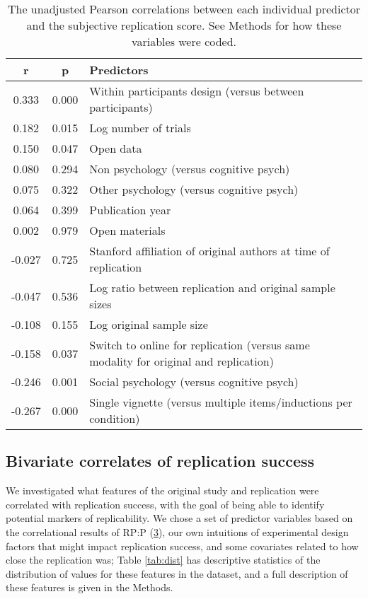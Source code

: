 \documentclass[
  english,
  a4paper,
]{article}
\begin{document}
\begin{table}[!h]

\caption{\label{tab:cor}The unadjusted Pearson correlations between each individual predictor and the subjective replication score. See Methods for how these variables were coded.}
\centering
\fontsize{10}{12}\selectfont
\begin{tabular}[t]{ccl}
\toprule
r & p & Predictors\\
\midrule
0.333 & 0.000 & Within participants design (versus between participants)\\
0.182 & 0.015 & Log number of  trials\\
0.150 & 0.047 & Open data\\
0.080 & 0.294 & Non psychology (versus cognitive psych)\\
0.075 & 0.322 & Other psychology (versus cognitive psych)\\
0.064 & 0.399 & Publication year\\
0.002 & 0.979 & Open materials\\
-0.027 & 0.725 & Stanford affiliation of original authors at time of replication\\
-0.047 & 0.536 & Log ratio between replication and original sample sizes\\
-0.108 & 0.155 & Log original sample size\\
-0.158 & 0.037 & Switch to online for replication (versus same modality for original and replication)\\
-0.246 & 0.001 & Social psychology (versus cognitive psych)\\
-0.267 & 0.000 & Single vignette (versus multiple items/inductions per condition)\\
\bottomrule
\end{tabular}
\end{table}

\hypertarget{bivariate-correlates-of-replication-success}{%
\subsection{Bivariate correlates of replication success}\label{bivariate-correlates-of-replication-success}}

We investigated what features of the original study and replication were correlated with replication success, with the goal of being able to identify potential markers of replicability. We chose a set of predictor variables based on the correlational results of RP:P (\protect\hyperlink{ref-openscienceconsortium2015}{3}), our own intuitions of experimental design factors that might impact replication success, and some covariates related to how close the replication was; Table \ref{tab:dist} has descriptive statistics of the distribution of values for these features in the dataset, and a full description of these features is given in the Methods.
\end{document}
